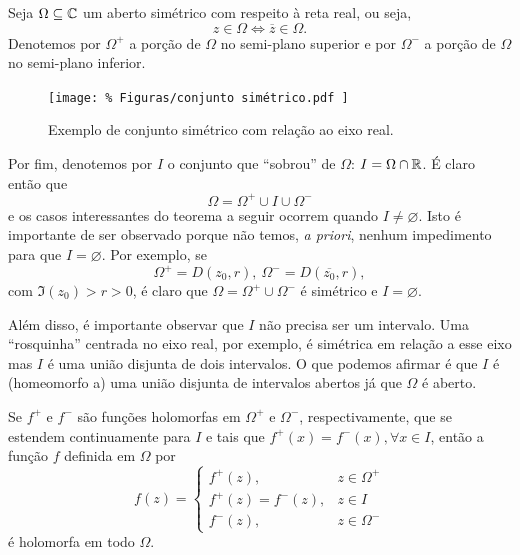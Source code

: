     Seja $\Omega\subseteq\mathbb{C}$ um aberto simétrico com respeito à reta real, ou seja,
    \begin{equation*}
        z\in\Omega \iff \overline{z}\in\Omega.
    \end{equation*}
    Denotemos por 
    $\Omega^+$ a porção de $\Omega$ no semi-plano superior e por 
    $\Omega^-$ a porção de $\Omega$ no semi-plano inferior.
    \begin{figure}[H]\centering
        \texttt{[image: \%
            Figuras/conjunto simétrico.pdf
        ]}
        \caption{Exemplo de conjunto simétrico com relação ao eixo real.}
    \end{figure}
    Por fim, denotemos por $I$ o conjunto que ``sobrou'' de $\Omega$: 
    $I = \Omega\cap\mathbb{R}$. É claro então que
    \begin{equation*}
        \Omega = \Omega^+ \cup I \cup \Omega^-
    \end{equation*}
    e os casos interessantes do teorema a seguir ocorrem quando $I\neq\varnothing$.
    Isto é importante de ser observado porque não temos, {\it a priori}, nenhum
    impedimento para que $I = \varnothing$. Por exemplo, se
    \begin{equation*}
        \Omega^+ = D(z_0, r), \ \Omega^- = D(\overline{z_0},r),
    \end{equation*}
    com $\Im(z_0) > r > 0$, é claro que $\Omega = \Omega^+\cup\Omega^-$ é simétrico
    e $I = \varnothing$.
    
    Além disso, é importante observar que $I$ não precisa ser um intervalo. Uma
    ``rosquinha'' centrada no eixo real, por exemplo, é simétrica em relação a esse eixo
    mas $I$ é uma união disjunta de dois intervalos. O que podemos afirmar é que
    $I$ é (homeomorfo a) uma união disjunta de intervalos abertos já que $\Omega$ é aberto.
    
    \begin{teorema}
    \label{teo-principio-simetria}
        Se $f^+$ e $f^-$ são funções holomorfas em $\Omega^+$ e $\Omega^-$, respectivamente,
        que se estendem continuamente para $I$ e tais que $f^+(x) = f^-(x), \forall x\in I$,
        então a função $f$ definida em $\Omega$ por
        \begin{equation*}
            f(z) =  \begin{cases}
                      f^+(z),          & z\in\Omega^+ \\
                      f^+(z) = f^-(z), & z\in I       \\
                      f^-(z),          & z\in\Omega^-
                    \end{cases}
        \end{equation*}
        é holomorfa em todo $\Omega$.
    \end{teorema}
    
